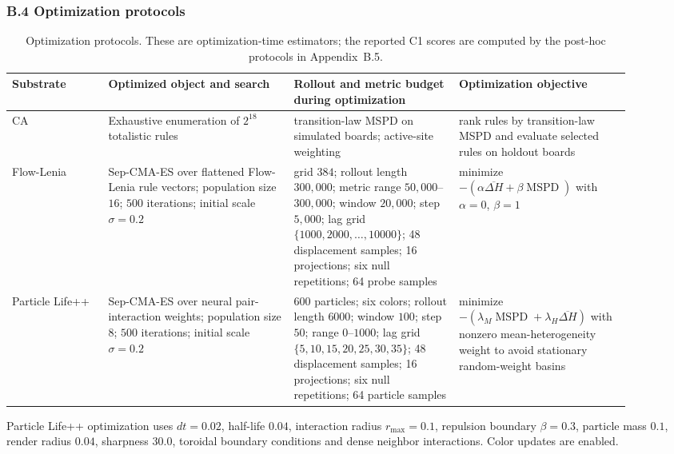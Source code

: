 \subsubsection*{B.4 Optimization protocols}

\begin{table}[H]
\centering
\scriptsize
\begin{tabular}{p{0.14\linewidth}p{0.27\linewidth}p{0.24\linewidth}p{0.25\linewidth}}
\toprule
Substrate & Optimized object and search & Rollout and metric budget during optimization & Optimization objective \\
\midrule
CA & Exhaustive enumeration of $2^{18}$ totalistic rules & transition-law MSPD on simulated boards; active-site weighting & rank rules by transition-law MSPD and evaluate selected rules on holdout boards \\
Flow-Lenia & Sep-CMA-ES over flattened Flow-Lenia rule vectors; population size $16$; $500$ iterations; initial scale $\sigma=0.2$ & grid $384$; rollout length $300{,}000$; metric range $50{,}000$--$300{,}000$; window $20{,}000$; step $5{,}000$; lag grid $\{1000,2000,\ldots,10000\}$; 48 displacement samples; 16 projections; six null repetitions; 64 probe samples & minimize $-(\alpha\overline{\Delta H}+\beta\operatorname{MSPD})$ with $\alpha=0$, $\beta=1$ \\
Particle Life++ & Sep-CMA-ES over neural pair-interaction weights; population size $8$; $500$ iterations; initial scale $\sigma=0.2$ & $600$ particles; six colors; rollout length $6000$; window $100$; step $50$; range $0$--$1000$; lag grid $\{5,10,15,20,25,30,35\}$; 48 displacement samples; 16 projections; six null repetitions; 64 particle samples & minimize $-(\lambda_M\operatorname{MSPD}+\lambda_H\overline{\Delta H})$ with nonzero mean-heterogeneity weight to avoid stationary random-weight basins \\
\bottomrule
\end{tabular}
\caption{Optimization protocols.  These are optimization-time estimators; the reported C1 scores are computed by the post-hoc protocols in Appendix~B.5.}
\label{tab:optimization-protocols}
\end{table}
\FloatBarrier

Particle Life++ optimization uses $dt=0.02$, half-life $0.04$, interaction radius $r_{\max}=0.1$, repulsion boundary $\beta=0.3$, particle mass $0.1$, render radius $0.04$, sharpness $30.0$, toroidal boundary conditions and dense neighbor interactions.  Color updates are enabled.

